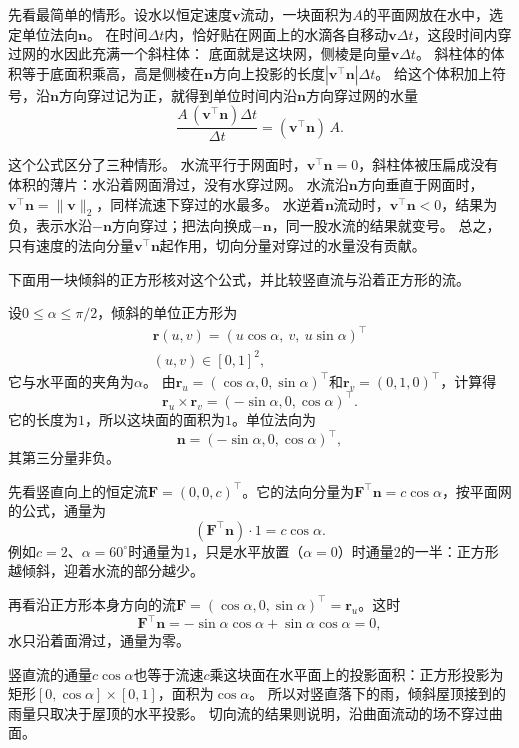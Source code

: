 先看最简单的情形。设水以恒定速度$\bm v$流动，一块面积为$A$的平面网放在水中，选定单位法向$\bm n$。
在时间$\Delta t$内，恰好贴在网面上的水滴各自移动$\bm v\Delta t$，这段时间内穿过网的水因此充满一个斜柱体：
底面就是这块网，侧棱是向量$\bm v\Delta t$。
斜柱体的体积等于底面积乘高，高是侧棱在$\bm n$方向上投影的长度$|\bm v^\top\bm n|\Delta t$。
给这个体积加上符号，沿$\bm n$方向穿过记为正，就得到单位时间内沿$\bm n$方向穿过网的水量
\[
 \frac{A\,(\bm v^\top\bm n)\Delta t}{\Delta t}=(\bm v^\top\bm n)\,A.
\]

这个公式区分了三种情形。
水流平行于网面时，$\bm v^\top\bm n=0$，斜柱体被压扁成没有体积的薄片：水沿着网面滑过，没有水穿过网。
水流沿$\bm n$方向垂直于网面时，$\bm v^\top\bm n=\lVert\bm v\rVert_2$，同样流速下穿过的水最多。
水逆着$\bm n$流动时，$\bm v^\top\bm n<0$，结果为负，表示水沿$-\bm n$方向穿过；把法向换成$-\bm n$，同一股水流的结果就变号。
总之，只有速度的法向分量$\bm v^\top\bm n$起作用，切向分量对穿过的水量没有贡献。

下面用一块倾斜的正方形核对这个公式，并比较竖直流与沿着正方形的流。

\begin{example}[竖直流与切向流穿过倾斜正方形]
\label{ex:analysis-tilted-square-flux}
设$0\leq\alpha\leq\pi/2$，倾斜的单位正方形为
\[
\begin{gathered}
\bm r(u,v)=(u\cos\alpha,\ v,\ u\sin\alpha)^\top\\
(u,v)\in[0,1]^2,
\end{gathered}
\]
它与水平面的夹角为$\alpha$。
由$\bm r_u=(\cos\alpha,0,\sin\alpha)^\top$和$\bm r_v=(0,1,0)^\top$，计算得
\[
 \bm r_u\times\bm r_v=(-\sin\alpha,0,\cos\alpha)^\top.
\]
它的长度为$1$，所以这块面的面积为$1$。单位法向为
\[
 \bm n=(-\sin\alpha,0,\cos\alpha)^\top ,
\]
其第三分量非负。

先看竖直向上的恒定流$\bm F=(0,0,c)^\top$。它的法向分量为$\bm F^\top\bm n=c\cos\alpha$，按平面网的公式，通量为
\[
 (\bm F^\top\bm n)\cdot1=c\cos\alpha.
\]
例如$c=2$、$\alpha=60^\circ$时通量为$1$，只是水平放置（$\alpha=0$）时通量$2$的一半：正方形越倾斜，迎着水流的部分越少。

再看沿正方形本身方向的流$\bm F=(\cos\alpha,0,\sin\alpha)^\top=\bm r_u$。这时
\[
 \bm F^\top\bm n=-\sin\alpha\cos\alpha+\sin\alpha\cos\alpha=0,
\]
水只沿着面滑过，通量为零。
\end{example}

竖直流的通量$c\cos\alpha$也等于流速$c$乘这块面在水平面上的投影面积：正方形投影为矩形$[0,\cos\alpha]\times[0,1]$，面积为$\cos\alpha$。
所以对竖直落下的雨，倾斜屋顶接到的雨量只取决于屋顶的水平投影。
切向流的结果则说明，沿曲面流动的场不穿过曲面。

